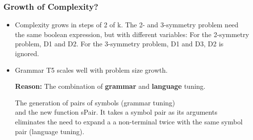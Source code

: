 \begin{frame}
\frametitle{
Growth of Complexity?
}
\begin{itemize}
\item Complexity grows in steps of 2 of k.
       The 2- and 3-symmetry problem need the same boolean expression,
       but with different variables:
       For the 2-symmetry problem, D1 and D2.
       For the 3-symmetry problem, D1 and D3,
       D2 is ignored.
\item Grammar T5 scales well with problem size growth.
 
  {\bf Reason:} The combination of {\bf grammar} and
        {\bf language} tuning.
 
The generation of pairs of symbols
                 (grammar tuning) \\
  and the new function sPair. It takes a 
  symbol pair as its arguments eliminates the need to expand a 
  a non-terminal twice with the same symbol pair
  (language tuning).
\end{itemize}
\end{frame}
